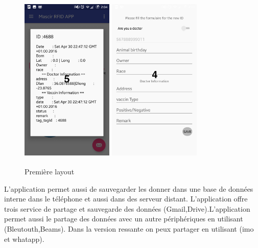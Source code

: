 \documentclass[11pt, a4paper, twoside]{book}
\begin{document}
\begin{figure}[H]
\centering
\includegraphics[width=4.4cm,height=8cm]{showdialog}
\includegraphics[width=4.4cm,height=8cm]{form}
\caption{Première layout}
\end{figure}

L'application permet aussi de sauvegarder les donner dans une base de données interne dans le téléphone et aussi dans des serveur distant. L'application offre trois service de partage et sauvegarde des données (Gmail,Drive).L'application permet aussi le partage des données avec un autre périphériques en utilisant (Bleutouth,Beams). Dans la version ressante on peux partager en utilisant (imo et whatapp).
 
\end{document}

